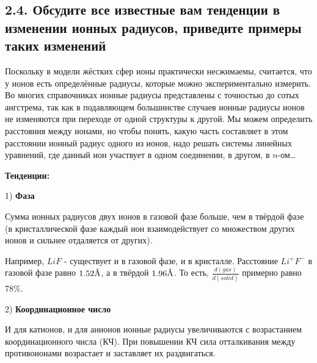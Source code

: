 
\subsection{2.4. Обсудите все известные вам тенденции в изменении ионных радиусов, приведите примеры таких изменений} 

\par\bigskip


Поскольку в модели жёстких сфер ионы практически несжимаемы,
считается, что у ионов есть определённые радиусы, которые можно
экспериментально измерить. Во многих справочниках ионные
радиусы представлены с точностью до сотых ангстрема, так как в
подавляющем большинстве случаев ионные радиусы ионов не
изменяются при переходе от одной структуры к другой. Мы можем
определить расстояния между ионами, но чтобы понять, какую
часть составляет в этом расстоянии ионный радиус одного из
ионов, надо решать системы линейных уравнений, где данный ион
участвует в одном соединении, в другом, в $n$-ом…

\par\smallskip
\begin{center}
\textbf{Тенденции:}
\end{center}

1) \textbf{Фаза}

\par\smallskip

Сумма ионных радиусов двух ионов в газовой фазе больше, чем
в твёрдой фазе (в кристаллической фазе каждый ион
взаимодействует со множеством других ионов и сильнее
отдаляется от других).

\par\smallskip

Например, $LiF$ - существует и в газовой фазе, и в кристалле.
Расстояние $Li^+ F^-$ в газовой фазе равно $1.52 \textup{\AA}$, а в твёрдой $1.96 \textup{\AA}$. То есть, $\frac{d(gas)}{d(solid)}$ примерно равно $78\%$.

\par\smallskip

2) \textbf{Координационное число}

\par\smallskip

И для катионов, и для анионов ионные радиусы увеличиваются
с возрастанием координационного числа (КЧ). При повышении
КЧ сила отталкивания между противоионами возрастает и
заставляет их раздвигаться.

\par\smallskip

